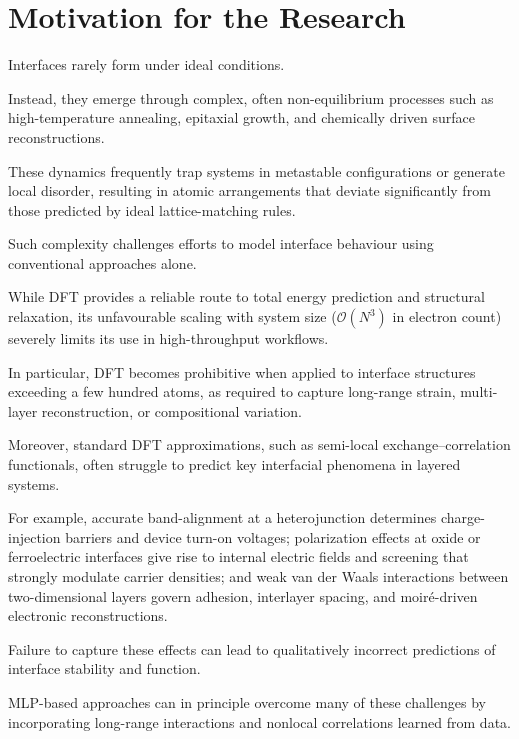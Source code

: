 \section{Motivation for the Research} \label{section:motivation}

\label{para:nonideal_interface_formation} %

Interfaces rarely form under ideal conditions.

Instead, they emerge through complex, often non-equilibrium processes such as high-temperature annealing, epitaxial
growth, and chemically driven surface reconstructions.

These dynamics frequently trap systems in metastable configurations or generate local disorder, resulting in atomic
arrangements that deviate significantly from those predicted by ideal lattice-matching rules.

Such complexity challenges efforts to model interface behaviour using conventional approaches alone.

\label{para:dft_scaling_limitations} %

While DFT provides a reliable route to total energy prediction and structural relaxation,
its unfavourable scaling with system size ($\mathcal{O}(N^3)$ in electron count) severely limits its use in
high-throughput workflows.

In particular, DFT becomes prohibitive when applied to interface structures exceeding a few hundred atoms, as required
to capture long-range strain, multi-layer reconstruction, or compositional variation.

Moreover, standard DFT approximations, such as semi-local exchange–correlation functionals, often struggle to predict key
interfacial phenomena in layered systems.

For example, accurate band-alignment at a heterojunction determines charge-injection barriers and device turn-on
voltages; polarization effects at oxide or ferroelectric interfaces give rise to internal electric fields and
screening that strongly modulate carrier densities; and weak van der Waals interactions between two-dimensional
layers govern adhesion, interlayer spacing, and moiré-driven electronic reconstructions.

Failure to capture these effects can lead to qualitatively incorrect predictions of interface stability and function.

MLP-based approaches can in principle overcome many of these challenges by incorporating
long-range interactions and nonlocal correlations learned from data.

